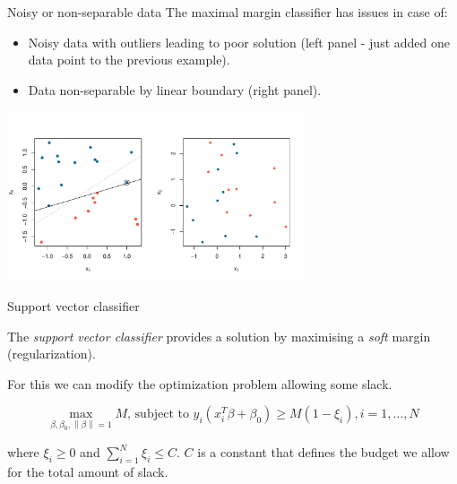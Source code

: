 \documentclass[notes]{beamer}          %
\newcommand{\norm}[1]{\left\lVert#1\right\rVert}
\providecommand{\norm}[1]{\lVert#1\rVert}
\begin{document}
\begin{frame}{Noisy or non-separable data}
The maximal margin classifier has issues in case of:
\begin{itemize}
    \item Noisy data with outliers leading to poor solution (left panel - just added one data point to the previous example).
    \item Data non-separable by linear boundary (right panel).
\end{itemize}

\begin{center}
\includegraphics[height=5cm]{figures/week_6/svm_outlier_or_not_separable.pdf}  
\end{center}
    
\end{frame}


\begin{frame}{Support vector classifier}

The \textit{support vector classifier} provides a solution by maximising a \textit{soft} margin (regularization).

\vspace{5mm}

For this we can modify the optimization problem allowing some slack.

\begin{equation*}
\max_{\beta, \beta_0, \norm{\beta} = 1} M \text{, subject to } y_i(x^T_i \beta + \beta_0) \geq M (1-\xi_i), i=1, \dots, N
\end{equation*}

where $\xi_i \geq 0$ and $\sum_{i=1}^N \xi_i \leq C$. $C$ is a constant that defines the budget we allow for the total amount of slack.

\vspace{5mm}



\end{frame}
\end{document}
